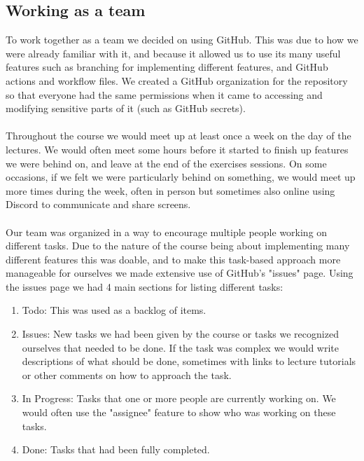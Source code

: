 \subsection*{Working as a team}

To work together as a team we decided on using GitHub. This was due to how we were already familiar with it, and because it allowed us to use its many useful features such as branching for implementing different features, and GitHub actions and workflow files. We created a GitHub organization for the repository so that everyone had the same permissions when it came to accessing and modifying sensitive parts of it (such as GitHub secrets).
\\\\
Throughout the course we would meet up at least once a week on the day of the lectures. We would often meet some hours before it started to finish up features we were behind on, and leave at the end of the exercises sessions. On some occasions, if we felt we were particularly behind on something, we would meet up more times during the week, often in person but sometimes also online using Discord to communicate and share screens.
\\\\
Our team was organized in a way to encourage multiple people working on different tasks. Due to the nature of the course being about implementing many different features this was doable, and to make this task-based approach more manageable for ourselves we made extensive use of GitHub's "issues" page. Using the issues page we had 4 main sections for listing different tasks:

\begin{enumerate}
    \item Todo: This was used as a backlog of items.
    \item Issues: New tasks we had been given by the course or tasks we recognized ourselves that needed to be done. If the task was complex we would write descriptions of what should be done, sometimes with links to lecture tutorials or other comments on how to approach the task.
    \item In Progress: Tasks that one or more people are currently working on. We would often use the "assignee" feature to show who was working on these tasks.
    \item Done: Tasks that had been fully completed.
\end{enumerate}

